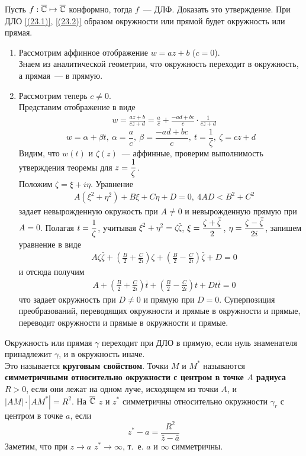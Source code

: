 \Exse
Пусть $f: \overline{\mathbb{C}} \mapsto \overline{\mathbb{C}}$ конформно, тогда $f$~--- ДЛФ. Доказать это
утверждение.
\theorem
При ДЛО \eqref{(23.1)}, \eqref{(23.2)} образом окружности или прямой будет
окружность или прямая.
\pr
~
\begin{enumerate}
    \item Рассмотрим аффинное отображение $w = az+b$ ($c = 0$).
    \\
    Знаем из аналитической геометрии, что окружность переходит в окружность, а
    прямая~--- в прямую.
    \item Рассмотрим теперь $c \neq 0$.
    \\
    Представим отображение в виде
    \begin{align*}
      & w = \frac{az+b}{cz+d} = \frac{a}{c} + \frac{-ad+bc}{c}\cdot \frac{1}{cz+d}
    \end{align*}
    \begin{equation}\label{(23.4)}
        w = \alpha + \beta t, \ \alpha = \frac{a}{c}, \ \beta = \frac{-ad+bc}{c}, \ t = \frac{1}{\zeta}, \ \zeta = cz+d
    \end{equation}
    Видим, что $w(t)$ и $\zeta(z)$~--- аффинные, проверим выполнимость
    утверждения теоремы для $z = \displaystyle \frac{1}{\zeta}$.
    \\
    Положим $\zeta = \xi + i \eta$. Уравнение
    \begin{align*}
      & A(\xi^2+\eta^2) + B\xi + C\eta + D = 0, \ 4AD < B^2+C^2
    \end{align*}
    задает невырожденную окружость при $A \neq 0$ и невырожденную прямую при $A =
    0$. Полагая $t = \displaystyle \frac{1}{\zeta}$, учитывая $\xi^2 + \eta^2 =
    \zeta\bar{\zeta}$, $\xi = \displaystyle \frac{\zeta + \bar{\zeta}}{2}$, $\eta = \displaystyle
    \frac{\zeta - \bar{\zeta}}{2i}$, запишем уравнение в виде
    \begin{align*}
      & A\zeta\bar{\zeta} + \left( \frac{B}{2} + \frac{C}{2i}\right)\zeta + \left( \frac{B}{2} - \frac{C}{2i}\right)\bar{\zeta} + D = 0
    \end{align*}
    и отсюда получим
    \begin{align*}
      & A + \left( \frac{B}{2} + \frac{C}{2i}\right)\bar{t} + \left( \frac{B}{2} - \frac{C}{2i}\right)t + Dt\bar{t} = 0
    \end{align*}
    что задает окружность при $D \neq 0$ и прямую при $D = 0$. Суперпозиция
    преобразований, переводящих окружности и прямые в окружности и прямые,
    переводит окружности и прямые в окружности и прямые.
\end{enumerate}
\Note
Окружность или прямая $\gamma$ переходит при ДЛО в прямую, если нуль знаменателя
принадлежит $\gamma$, и в окружность иначе.
\\
Это называется \textbf{круговым свойством}.
\Def
Точки $M$ и $M^*$ называются \textbf{симметричными относительно окружности с
  центром в точке $A$ радиуса $R > 0$}, если они лежат на одном луче, исходящем
из точки $A$, и $\left| AM \right| \cdot \left| AM^* \right| = R^2$. На $\overline{\mathbb{C}}$
$z$ и $z^*$ симметричны относительно окружности $\gamma_r$ с центром в точке
$a$, если
\begin{equation}\label{(23.5)}
    z^* - a = \frac{R^2}{\bar{z} - \bar{a}}
\end{equation}
Заметим, что при $z \to a$ $z^* \to \infty$, т.~е. $a$ и $\infty$ симметричны.